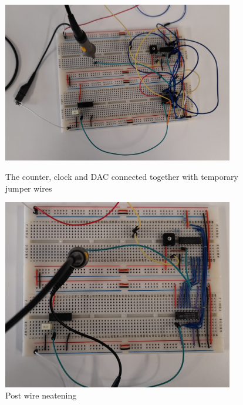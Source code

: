 \begin{figure}[H]
    \centering
    \begin{minipage}[t]{0.45\textwidth}
        \centering
        \includegraphics[width=0.9\textwidth]{images/counterJumperTestCropped.jpg}
        \caption{The counter, clock and DAC connected together with temporary jumper wires}
        \label{fig:counterTesting1}
    \end{minipage}\hfill
    \begin{minipage}[t]{0.45\textwidth}
        \centering
        \includegraphics[width=0.9\textwidth]{images/counterNeatenedTestCropped.jpg}
        \caption{Post wire neatening}
        \label{fig:counterTesting2}
    \end{minipage}
\end{figure}

